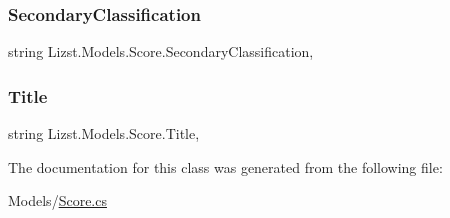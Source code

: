 \subsubsection{\texorpdfstring{SecondaryClassification}{SecondaryClassification}}
{\footnotesize\ttfamily string Lizst.\+Models.\+Score.\+Secondary\+Classification\hspace{0.3cm}{\ttfamily [get]}, {\ttfamily [set]}}

\mbox{\label{class_lizst_1_1_models_1_1_score_a5df567b6594f1cf21822a3db5349cb69}} 
\subsubsection{\texorpdfstring{Title}{Title}}
{\footnotesize\ttfamily string Lizst.\+Models.\+Score.\+Title\hspace{0.3cm}{\ttfamily [get]}, {\ttfamily [set]}}



The documentation for this class was generated from the following file\+:\begin{DoxyCompactItemize}
\item 
Models/\mbox{\hyperlink{_score_8cs}{Score.\+cs}}\end{DoxyCompactItemize}
